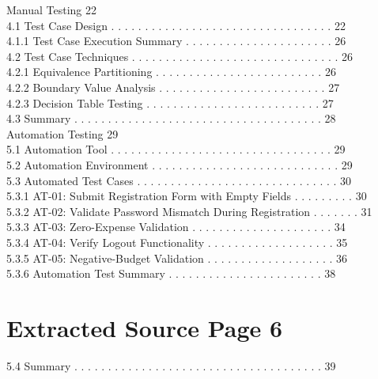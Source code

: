 \documentclass[12pt,a4paper]{report}
\begin{document}
 Manual Testing                                                                             22\\ 
4.1 Test Case Design . . . . . . . . . . . . . . . . . . . . . . . . . . . . . . . . .     22\\ 
4.1.1 Test Case Execution Summary . . . . . . . . . . . . . . . . . . . . . .          26\\ 
4.2 Test Case Techniques . . . . . . . . . . . . . . . . . . . . . . . . . . . . . . .     26\\ 
4.2.1 Equivalence Partitioning . . . . . . . . . . . . . . . . . . . . . . . . .       26\\ 
4.2.2 Boundary Value Analysis . . . . . . . . . . . . . . . . . . . . . . . . .        27\\ 
4.2.3 Decision Table Testing . . . . . . . . . . . . . . . . . . . . . . . . . .       27\\ 
4.3 Summary . . . . . . . . . . . . . . . . . . . . . . . . . . . . . . . . . . . . .      28\\ 

 Automation Testing                                                                         29\\ 
5.1 Automation Tool . . . . . . . . . . . . . . . . . . . . . . . . . . . . . . . . .      29\\ 
5.2 Automation Environment . . . . . . . . . . . . . . . . . . . . . . . . . . . .         29\\ 
5.3 Automated Test Cases . . . . . . . . . . . . . . . . . . . . . . . . . . . . . .       30\\ 
5.3.1 AT-01: Submit Registration Form with Empty Fields . . . . . . . . .              30\\ 
5.3.2 AT-02: Validate Password Mismatch During Registration . . . . . . .              31\\ 
5.3.3 AT-03: Zero-Expense Validation . . . . . . . . . . . . . . . . . . . . .         34\\ 
5.3.4 AT-04: Verify Logout Functionality . . . . . . . . . . . . . . . . . . .         35\\ 
5.3.5 AT-05: Negative-Budget Validation . . . . . . . . . . . . . . . . . . .          36\\ 
5.3.6 Automation Test Summary . . . . . . . . . . . . . . . . . . . . . . .            38\\ 

\clearpage
\section*{Extracted Source Page 6}
5.4   Summary . . . . . . . . . . . . . . . . . . . . . . . . . . . . . . . . . . . . .   39\\ 
\end{document}

